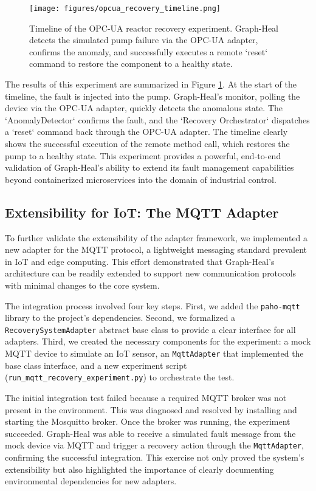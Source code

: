 \documentclass[11pt,conference]{IEEEtran}
\begin{document}
\begin{figure}[ht]
  \centering
  \texttt{[image: figures/opcua\_recovery\_timeline.png]}
  \caption{Timeline of the OPC-UA reactor recovery experiment. Graph-Heal detects the simulated pump failure via the OPC-UA adapter, confirms the anomaly, and successfully executes a remote `reset` command to restore the component to a healthy state.}
  \label{fig:opcua-recovery}
\end{figure}

The results of this experiment are summarized in Figure \ref{fig:opcua-recovery}. At the start of the timeline, the fault is injected into the pump. Graph-Heal's monitor, polling the device via the OPC-UA adapter, quickly detects the anomalous state. The `AnomalyDetector` confirms the fault, and the `Recovery Orchestrator` dispatches a `reset` command back through the OPC-UA adapter. The timeline clearly shows the successful execution of the remote method call, which restores the pump to a healthy state. This experiment provides a powerful, end-to-end validation of Graph-Heal's ability to extend its fault management capabilities beyond containerized microservices into the domain of industrial control.

\subsection{Extensibility for IoT: The MQTT Adapter}
To further validate the extensibility of the adapter framework, we implemented a new adapter for the MQTT protocol, a lightweight messaging standard prevalent in IoT and edge computing. This effort demonstrated that Graph-Heal's architecture can be readily extended to support new communication protocols with minimal changes to the core system.

The integration process involved four key steps. First, we added the \texttt{paho-mqtt} library to the project's dependencies. Second, we formalized a \texttt{RecoverySystemAdapter} abstract base class to provide a clear interface for all adapters. Third, we created the necessary components for the experiment: a mock MQTT device to simulate an IoT sensor, an \texttt{MqttAdapter} that implemented the base class interface, and a new experiment script (\texttt{run\_mqtt\_recovery\_experiment.py}) to orchestrate the test.

The initial integration test failed because a required MQTT broker was not present in the environment. This was diagnosed and resolved by installing and starting the Mosquitto broker. Once the broker was running, the experiment succeeded. Graph-Heal was able to receive a simulated fault message from the mock device via MQTT and trigger a recovery action through the \texttt{MqttAdapter}, confirming the successful integration. This exercise not only proved the system's extensibility but also highlighted the importance of clearly documenting environmental dependencies for new adapters.
\end{document}
